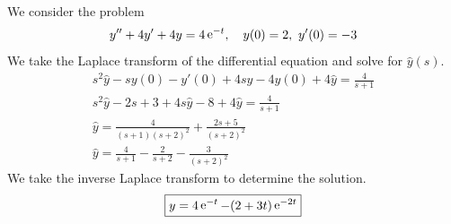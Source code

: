 {\begin{Solution}
  \label{solution y4y4y=4e-t}
    We consider the problem
  \[
  y''+ 4 y' + 4 y = 4 \mathop{\mathrm{e}}\nolimits^{-t}, \quad y(0) = 2,~y'(0) = -3
  \]
  We take the Laplace transform of the differential equation
  and solve for $\hat{y}(s)$.
  \begin{gather*}
    s^2 \hat{y} - s y(0) - y'(0) + 4 s \hat{y} - 4 y(0) + 4 \hat{y} 
    = \frac{4}{s + 1}
    \\
    s^2 \hat{y} - 2 s + 3 + 4 s \hat{y} - 8 + 4 \hat{y} = \frac{4}{s + 1}
    \\
    \hat{y} = \frac{4}{(s + 1)(s + 2)^2} + \frac{2 s + 5}{(s + 2)^2}
    \\
    \hat{y} = \frac{4}{s + 1} - \frac{2}{s + 2} - \frac{3}{(s + 2)^2}
  \end{gather*}
  We take the inverse Laplace transform to determine the solution.
  \[
  \boxed{
    y = 4 \mathop{\mathrm{e}}\nolimits^{-t} - ( 2 + 3 t) \mathop{\mathrm{e}}\nolimits^{-2 t}
    }
  \]
\end{Solution}








\raggedbottom
}
